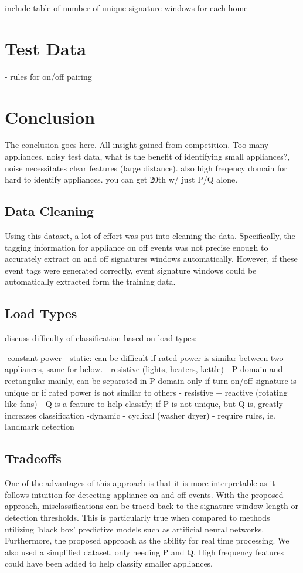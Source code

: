 \documentclass[conference]{IEEEtran}
\begin{document}
include table of number of unique signature windows for each home

\section{Test Data}\label{sec:test}
- rules for on/off pairing

\section{Conclusion}\label{sec:concl}
The conclusion goes here. All insight gained from competition. Too many appliances, noisy test data, what is the benefit of identifying small appliances?, noise necessitates clear features (large distance).  also high freqency domain for hard to identify appliances.  you can get 20th w/ just P/Q alone.   

\subsection{Data Cleaning}
Using this dataset, a lot of effort was put into cleaning the data.  Specifically, the tagging information for appliance on off events was not precise enough to accurately extract on and off signatures windows automatically.  However, if these event tags were generated correctly, event signature windows could be automatically extracted form the training data. 

\subsection{Load Types}
discuss difficulty of classification based on load types:

-constant power - static: can be difficult if rated power is similar between two appliances, same for below.
- resistive (lights, heaters, kettle) - P domain and rectangular mainly, can be separated in P domain only if turn on/off signature is unique or if rated power is not similar to others
- resistive + reactive (rotating like fans) - Q is a feature to help classify; if P is not unique, but Q is, greatly increases classification
-dynamic
	- cyclical (washer dryer) - require rules, ie. landmark detection
	
\subsection{Tradeoffs}
One of the advantages of this approach is that it is more interpretable as it follows intuition for detecting appliance on and off events.  With the proposed approach, misclassifications can be traced back to the signature window length or detection thresholds.  This is particularly true when compared to methods utilizing 'black box' predictive models such as artificial neural networks.  Furthermore, the proposed approach as the ability for real time processing. We also used a simplified dataset, only needing P and Q.  High frequency features could have been added to help classify smaller appliances.
\end{document}
